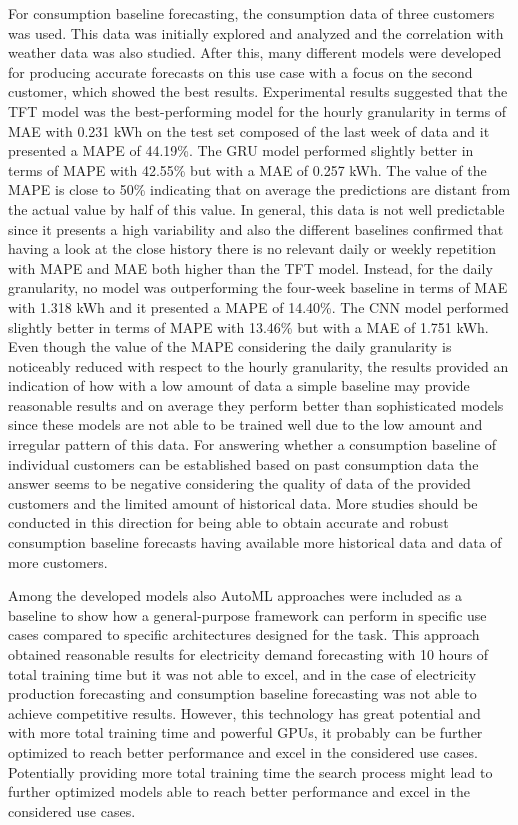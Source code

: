 For consumption baseline forecasting, the consumption data of three customers was used.
This data was initially explored and analyzed and the correlation with weather data was also studied.
After this, many different models were developed for producing accurate forecasts on this use case with a focus on the second customer, which showed the best results.
Experimental results suggested that the TFT model was the best-performing model for the hourly granularity in terms of MAE with 0.231 kWh on the test set composed of the last week of data and it presented a MAPE of 44.19\%.
The GRU model performed slightly better in terms of MAPE with 42.55\% but with a MAE of 0.257 kWh.
The value of the MAPE is close to 50\% indicating that on average the predictions are distant from the actual value by half of this value.
In general, this data is not well predictable since it presents a high variability and also the different baselines confirmed that having a look at the close history there is no relevant daily or weekly repetition with MAPE and MAE both higher than the TFT model.
Instead, for the daily granularity, no model was outperforming the four-week baseline in terms of MAE with 1.318 kWh and it presented a MAPE of 14.40\%.
The CNN model performed slightly better in terms of MAPE with 13.46\% but with a MAE of 1.751 kWh.
Even though the value of the MAPE considering the daily granularity is noticeably reduced with respect to the hourly granularity, the results provided an indication of how with a low amount of data a simple baseline may provide reasonable results and on average they perform better than sophisticated models since these models are not able to be trained well due to the low amount and irregular pattern of this data.
For answering whether a consumption baseline of individual customers can be established based on past consumption data the answer seems to be negative considering the quality of data of the provided customers and the limited amount of historical data.
More studies should be conducted in this direction for being able to obtain accurate and robust consumption baseline forecasts having available more historical data and data of more customers.

Among the developed models also AutoML approaches were included as a baseline to show how a general-purpose framework can perform in specific use cases compared to specific architectures designed for the task.
This approach obtained reasonable results for electricity demand forecasting with 10 hours of total training time but it was not able to excel, and in the case of electricity production forecasting and consumption baseline forecasting was not able to achieve competitive results.
However, this technology has great potential and with more total training time and powerful GPUs, it probably can be further optimized to reach better performance and excel in the considered use cases.
Potentially providing more total training time the search process might lead to further optimized models able to reach better performance and excel in the considered use cases.

